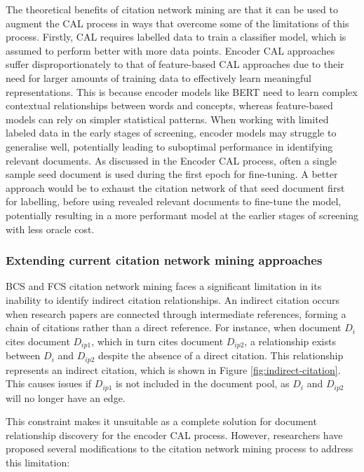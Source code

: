 \documentclass[10pt, english]{article}
\begin{document}
The theoretical benefits of citation network mining are that it can be used to augment the CAL process in ways that overcome some of the limitations of this process.  Firstly, CAL requires labelled data to train a classifier model, which is assumed to perform better with more data points. Encoder CAL approaches suffer disproportionately to that of feature-based CAL approaches due to their need for larger amounts of training data to effectively learn meaningful representations. This is because encoder models like BERT need to learn complex contextual relationships between words and concepts, whereas feature-based models can rely on simpler statistical patterns. When working with limited labeled data in the early stages of screening, encoder models may struggle to generalise well, potentially leading to suboptimal performance in identifying relevant documents. As discussed in the Encoder CAL process, often a single sample seed document is used during the first epoch for fine-tuning. A better approach would be to exhaust the citation network of that seed document first for labelling, before using revealed relevant documents to fine-tune the model, potentially resulting in a more performant model at the earlier stages of screening with less oracle cost. 

\subsubsection{Extending current citation network mining approaches}

BCS and FCS citation network mining faces a significant limitation in its inability to identify indirect citation relationships. An indirect citation occurs when research papers are connected through intermediate references, forming a chain of citations rather than a direct reference. For instance, when document $D_i$ cites document $D_{ip1}$, which in turn cites document $D_{ip2}$, a relationship exists between $D_i$ and $D_{ip2}$ despite the absence of a direct citation. This relationship represents an indirect citation, which is shown in Figure \ref{fig:indirect-citation}. This causes issues if $D_{ip1}$ is not included in the document pool, as $D_i$ and $D_{ip2}$ will no longer have an edge. 

This constraint makes it unsuitable as a complete solution for document relationship discovery for the encoder CAL process. However, researchers have proposed several modifications to the citation network mining process to address this limitation:
\end{document}
